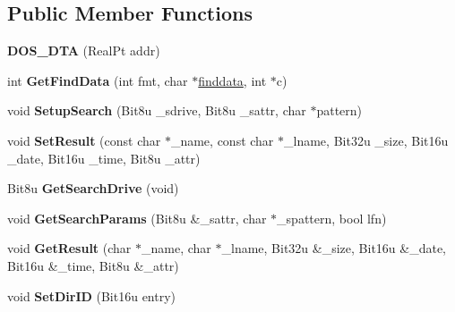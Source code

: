 \subsection*{Public Member Functions}
\begin{DoxyCompactItemize}
\item 
\hypertarget{classDOS__DTA_a26b5d5147e35f2b65dd6ef0cae1734e5}{{\bfseries D\-O\-S\-\_\-\-D\-T\-A} (Real\-Pt addr)}\label{classDOS__DTA_a26b5d5147e35f2b65dd6ef0cae1734e5}

\item 
\hypertarget{classDOS__DTA_acf11b08c492385c159aa90e340be3dd8}{int {\bfseries Get\-Find\-Data} (int fmt, char $\ast$\hyperlink{structfinddata}{finddata}, int $\ast$c)}\label{classDOS__DTA_acf11b08c492385c159aa90e340be3dd8}

\item 
\hypertarget{classDOS__DTA_afdc1b9e9dd1c54973249664febf61086}{void {\bfseries Setup\-Search} (Bit8u \-\_\-sdrive, Bit8u \-\_\-sattr, char $\ast$pattern)}\label{classDOS__DTA_afdc1b9e9dd1c54973249664febf61086}

\item 
\hypertarget{classDOS__DTA_a3fc2f99e5a52c26c1cb019c2c220f017}{void {\bfseries Set\-Result} (const char $\ast$\-\_\-name, const char $\ast$\-\_\-lname, Bit32u \-\_\-size, Bit16u \-\_\-date, Bit16u \-\_\-time, Bit8u \-\_\-attr)}\label{classDOS__DTA_a3fc2f99e5a52c26c1cb019c2c220f017}

\item 
\hypertarget{classDOS__DTA_a055cb2b2f1fcf3fd76ee76bbd608da30}{Bit8u {\bfseries Get\-Search\-Drive} (void)}\label{classDOS__DTA_a055cb2b2f1fcf3fd76ee76bbd608da30}

\item 
\hypertarget{classDOS__DTA_a6112ff7dd7637bdce72f72caed62e7ec}{void {\bfseries Get\-Search\-Params} (Bit8u \&\-\_\-sattr, char $\ast$\-\_\-spattern, bool lfn)}\label{classDOS__DTA_a6112ff7dd7637bdce72f72caed62e7ec}

\item 
\hypertarget{classDOS__DTA_a42bcadbc15a9a77ff82981bddeb24ca1}{void {\bfseries Get\-Result} (char $\ast$\-\_\-name, char $\ast$\-\_\-lname, Bit32u \&\-\_\-size, Bit16u \&\-\_\-date, Bit16u \&\-\_\-time, Bit8u \&\-\_\-attr)}\label{classDOS__DTA_a42bcadbc15a9a77ff82981bddeb24ca1}

\item 
\hypertarget{classDOS__DTA_ae695e3b2d7507351b4f68fd855f62942}{void {\bfseries Set\-Dir\-I\-D} (Bit16u entry)}\label{classDOS__DTA_ae695e3b2d7507351b4f68fd855f62942}


\end{DoxyCompactItemize}
